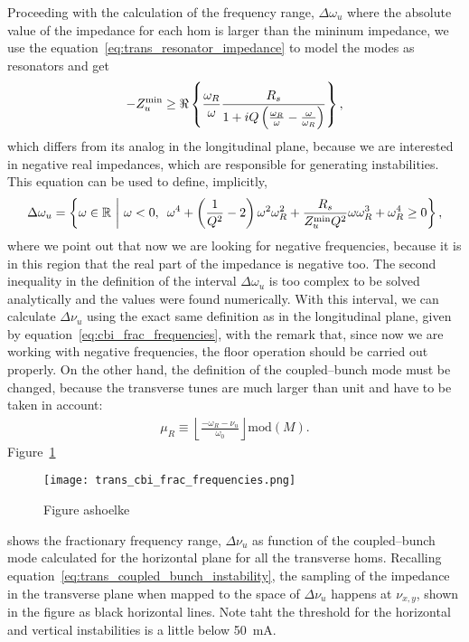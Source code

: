     Proceeding with the calculation of the frequency range, $\Delta\omega_u$ where the absolute value of the impedance for each \gls{hom} is larger than the mininum impedance, we use the equation~\eqref{eq:trans_resonator_impedance} to model the modes as resonators and get
    \begin{align}
        -Z_u^\text{min} \ge \Re\left\{\frac{\omega_R}{\omega}\frac{R_s}{1 + iQ\left(\frac{\omega_R}{\omega}-\frac{\omega}{\omega_R}\right)}\right\},
    \end{align}
    which differs from its analog in the longitudinal plane, because we are interested in negative real impedances, which are responsible for generating instabilities. This equation can be used to define, implicitly,
    \begin{align}
        \Delta\omega_u = \left\{\omega \in \mathbb{R\,\,} \middle|\,\,
        \omega < 0,\,\,\, \omega^4 + \left(\frac{1}{Q^2}-2\right)\omega^2\omega_R^2 + \frac{R_s}{Z_u^\text{min}Q^2}\omega\omega_R^3 + \omega_R^4 \ge 0 \right\},
    \end{align}
    where we point out that now we are looking for negative frequencies, because it is in this region that the real part of the impedance is negative too. The second inequality in the definition of the interval $\Delta\omega_u$ is too complex to be solved analytically and the values were found numerically. With this interval, we can calculate $\Delta\nu_u$ using the exact same definition as in the longitudinal plane, given by equation~\eqref{eq:cbi_frac_frequencies}, with the remark that, since now we are working with negative frequencies, the floor operation should be carried out properly. On the other hand, the definition of the coupled--bunch mode must be changed, because the transverse tunes are much larger than unit and have to be taken in account:
    \begin{align}
        \mu_R \equiv \left\lfloor\frac{-\omega_R-\nu_u}{\omega_0}\right\rfloor \text{mod}(M).
    \end{align}
    Figure~\ref{fig:trans_cbi_frac_frequencies}
    \begin{figure}
        \centering
        \texttt{[image: trans\_cbi\_frac\_frequencies.png]}
        \caption{Figure ashoelke}
        \label{fig:trans_cbi_frac_frequencies}
    \end{figure}
    shows the fractionary frequency range, $\Delta\nu_u$ as function of the coupled--bunch mode calculated for the horizontal plane for all the transverse \glspl{hom}. Recalling equation~\eqref{eq:trans_coupled_bunch_instability}, the sampling of the impedance in the transverse plane when mapped to the space of $\Delta\nu_u$ happens at $\nu_{x,y}$, shown in the figure as black horizontal lines. Note taht the threshold for the horizontal and vertical instabilities is a little below \SI{50}{\milli\ampere}.
